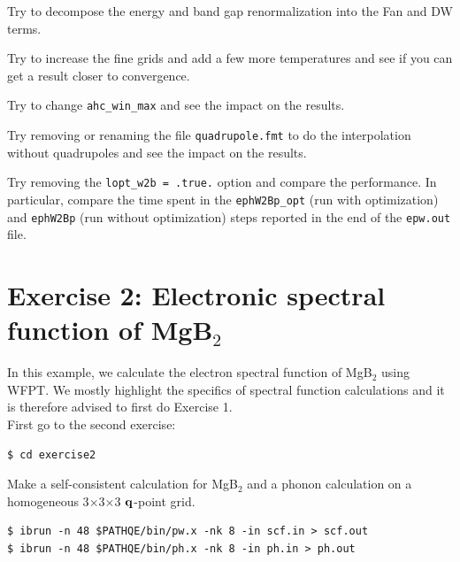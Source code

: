 \documentclass[a4paper,11pt,serif]{article}
\begin{document}
\action Try to decompose the energy and band gap renormalization into the Fan and DW terms.

\action Try to increase the fine grids and add a few more temperatures and see if you can get a result closer to convergence.

\action Try to change \texttt{ahc\_win\_max} and see the impact on the results.

\action Try removing or renaming the file \texttt{quadrupole.fmt} to do the interpolation without quadrupoles and see the impact on the results.

\action Try removing the \texttt{lopt\_w2b = .true.} option and compare the performance. In particular, compare the time spent in the \texttt{ephW2Bp\_opt} (run with optimization) and \texttt{ephW2Bp} (run without optimization) steps reported in the end of the \texttt{epw.out} file.



\newpage

\section*{Exercise 2: Electronic spectral function of MgB$_2$}
In this example, we calculate the electron spectral function of MgB$_2$ using WFPT.
We mostly highlight the specifics of spectral function calculations and it is therefore advised to first do Exercise 1.
\\

First go to the second exercise:
\begin{verbatim}
$ cd exercise2
\end{verbatim}


\action Make a self-consistent calculation for MgB$_2$ and a phonon calculation on a homogeneous 3$\times$3$\times$3 $\bf{q}$-point grid.



\begin{verbatim}
$ ibrun -n 48 $PATHQE/bin/pw.x -nk 8 -in scf.in > scf.out
$ ibrun -n 48 $PATHQE/bin/ph.x -nk 8 -in ph.in > ph.out
\end{verbatim}
\end{document}
